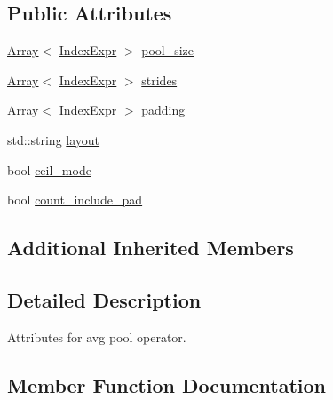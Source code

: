 \subsection*{Public Attributes}
\begin{DoxyCompactItemize}
\item 
\hyperlink{classtvm_1_1Array}{Array}$<$ \hyperlink{namespacetvm_1_1relay_ae153a27d81399fd266b8d598227764c4}{Index\+Expr} $>$ \hyperlink{structtvm_1_1relay_1_1AvgPool2DAttrs_ac1c60d41763495feac4b838ae3d161fc}{pool\+\_\+size}
\item 
\hyperlink{classtvm_1_1Array}{Array}$<$ \hyperlink{namespacetvm_1_1relay_ae153a27d81399fd266b8d598227764c4}{Index\+Expr} $>$ \hyperlink{structtvm_1_1relay_1_1AvgPool2DAttrs_ac005587ae05168fa8e1f2093243ec922}{strides}
\item 
\hyperlink{classtvm_1_1Array}{Array}$<$ \hyperlink{namespacetvm_1_1relay_ae153a27d81399fd266b8d598227764c4}{Index\+Expr} $>$ \hyperlink{structtvm_1_1relay_1_1AvgPool2DAttrs_a967c1e7c38963db0d388fe217437897e}{padding}
\item 
std\+::string \hyperlink{structtvm_1_1relay_1_1AvgPool2DAttrs_a73ebaf9cb43a74758479e341050f5ab7}{layout}
\item 
bool \hyperlink{structtvm_1_1relay_1_1AvgPool2DAttrs_a843fa213a45d524b669f11b7a0438eb7}{ceil\+\_\+mode}
\item 
bool \hyperlink{structtvm_1_1relay_1_1AvgPool2DAttrs_ab8af740bf62dcdc954cdd31f64e701d9}{count\+\_\+include\+\_\+pad}
\end{DoxyCompactItemize}
\subsection*{Additional Inherited Members}


\subsection{Detailed Description}
Attributes for avg pool operator. 

\subsection{Member Function Documentation}
